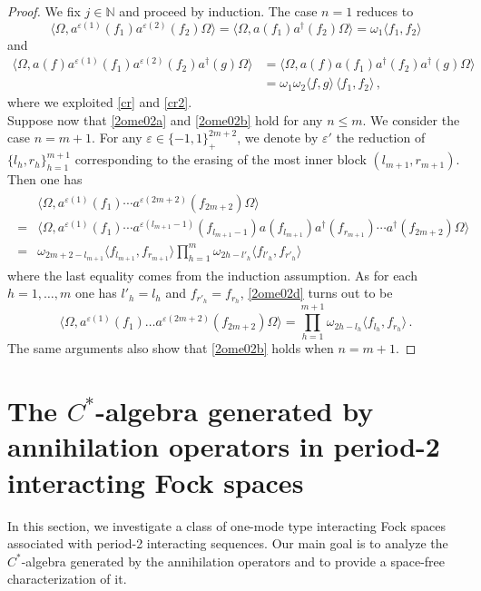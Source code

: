 \documentclass[12pt]{amsart}
\numberwithin{equation}{section}
\def\bn{{\mathbb N}}
\def\eps{\varepsilon}
\def\om{\omega} \def\Om{\Omega}
\theoremstyle{definition}
\begin{document}
\begin{proof}
We fix $j\in\bn$ and proceed by induction. The case $n=1$ reduces to
\[\langle\Om,a^{\eps(1)}(f_1) a^{\eps(2)}(f_2)\Om\rangle
=\langle\Om,a(f_1) a^\dag(f_2)\Om\rangle=\om_1\langle f_1,f_2\rangle\]
and
\begin{align*}
\langle\Om,a(f)a^{\eps(1)}(f_1) a^{\eps(2)}(f_2)a^\dag(g)\Om\rangle&=\langle\Om,a(f)a(f_1) a^\dag(f_2)a^\dag(g)\Om\rangle\\
&=
\om_1 \om_2\langle f,g\rangle \, \langle f_1,f_2\rangle\,,
\end{align*}
where we exploited \eqref{cr} and \eqref{cr2}.\\
Suppose now that \eqref{2ome02a} and \eqref{2ome02b} hold for any $n\leq m$. We consider the case $n=m+1$. For any $\eps\in\{-1,1\}^{2m+2}_+$, we denote by $\eps'$ the reduction of $\{l_h,r_h\}_{h=1}^{m+1}$ corresponding to the erasing of the most inner block $(l_{m+1}, r_{m+1})$. Then one has
\begin{align}
\begin{split}
\label{2ome02d}
&\langle\Om,a^{\eps(1)}(f_1)\cdots a^{\eps(2m+2)}(f_{2m+2}) \Om\rangle \\
=&\langle\Om,a^{\eps(1)}(f_1)\cdots a^{\eps(l_{m+1}-1)}(f_{l_{m+1}-1}) a(f_{l_{m+1}})a^\dag(f_{r_{m+1}})\cdots a^\dag(f_{2m+2})\Om\rangle \\
=&\om_{2m+2-l_{m+1}}\langle f_{l_{m+1}},f_{r_{m+1}}\rangle \prod_{h=1}^{m} \om_{2h-l'_h}\langle f_{l'_h},f_{r'_h}\rangle
\end{split}
\end{align}
where the last equality comes from the induction assumption. As for each $h=1,\ldots,m$ one has $l'_h=l_h$ and $f_{r'_h}=f_{r_h}$,  \eqref{2ome02d} turns out to be
$$
\langle\Om,a^{\eps(1)}(f_1)\ldots a^{\eps(2m+2)}(f_{2m+2}) \Om\rangle=\prod_{h=1}^{m+1}\om_{2h-l_h}\langle f_{l_h},f_{r_h}\rangle\,.
$$
The same arguments also show that \eqref{2ome02b} holds when $n=m+1$.
\end{proof}

\section{The $C^*$-algebra generated by annihilation operators in period-2 interacting Fock spaces}
In this section, we investigate a class of one-mode type interacting Fock spaces associated with period-2 interacting sequences. Our main goal is to analyze the $C^*$-algebra generated by the annihilation operators and to provide a space-free characterization of it. \\
\end{document}

